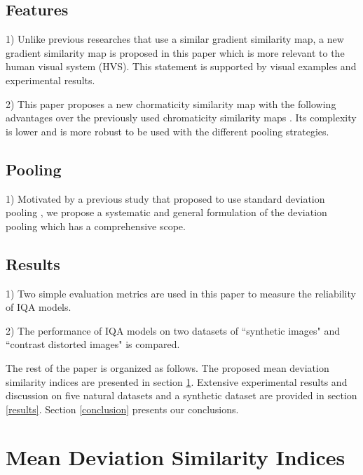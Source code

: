 \subsection{Features}
\label{A}

1) Unlike previous researches \cite{GSSIM, gradient2010, GS, FSIM, GMSD, VSI} that use a similar gradient similarity map, a new gradient similarity map is proposed in this paper which is more relevant to the human visual system (HVS). This statement is supported by visual examples and experimental results.

2) This paper proposes a new chormaticity similarity map with the following advantages over the previously used chromaticity similarity maps \cite{FSIM, VSI}. Its complexity is lower and is more robust to be used with the different pooling strategies.     

\subsection{Pooling}
\label{B}

1) Motivated by a previous study that proposed to use standard deviation pooling \cite{GMSD}, we propose a systematic and general formulation of the deviation pooling which has a comprehensive scope.    

\subsection{Results}
\label{C}

1) Two simple evaluation metrics are used in this paper to measure the reliability of IQA models.

2) The performance of IQA models on two datasets of ``synthetic images" and ``contrast distorted images" is compared.


\vspace{2mm}

The rest of the paper is organized as follows. The proposed mean deviation similarity indices are presented in section \ref{MDSI}. Extensive experimental results and discussion on five natural datasets and a synthetic dataset are provided in section \ref{results}. Section \ref{conclusion} presents our conclusions.             



\section{Mean Deviation Similarity Indices}
\label{MDSI}

